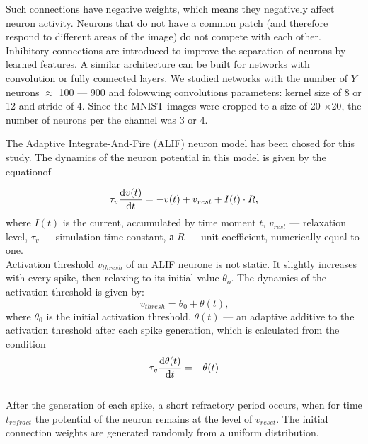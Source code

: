 \documentclass[a4paper,10pt]{article}
\begin{document}
Such connections have negative weights, which means they negatively affect neuron activity. Neurons that do not have a common patch (and therefore respond to different areas of the image) do not compete with each other. Inhibitory connections are introduced to improve the separation of neurons by learned features. A similar architecture can be built for networks with convolution or fully connected layers. We studied networks with the number of $Y$ neurons $\approx$ 100 --- 900 and folowwing convolutions parameters: kernel size of 8 or 12 and stride of 4. Since the MNIST images were cropped to a size of 20 $\times 20$, the number of neurons per the channel was 3 or 4.

The Adaptive Integrate-And-Fire (ALIF) neuron model has been chosed for this study. The dynamics of the neuron potential in this model is given by the equationof

\begin{equation} \label{eq:alif}
 \tau_v \dv{v(t)}{t} = -v(t) + v_{rest} + I(t) \cdot R \text{,}
\end{equation} where $I(t)$ is the current, accumulated by time moment $t$, $v_{rest}$ --- relaxation level, $\tau_v$ --- simulation time constant, а $R$ --- unit coefficient, numerically equal to one.\\ 

Activation threshold $v_{thresh}$ of an ALIF neurone is not static. It slightly increases with every spike, then relaxing to its initial value $\theta_o$. The dynamics of the activation threshold is given by:
\begin{equation} 
 v_{thresh} = \theta_0 + \theta(t) \text{,}
\end{equation} where $\theta_0$ is the initial activation threshold, $\theta(t)$ --- an adaptive additive to the activation threshold after each spike generation, which is calculated from the condition\\

\begin{equation}
 \tau_v \dv{\theta(t)}{t} = -\theta(t)
\end{equation}\\

After the generation of each spike, a short refractory period occurs, when for time $t_{refract}$ the potential of the neuron remains at the level of $v_{reset}$. The initial connection weights are generated randomly from a uniform distribution.
\end{document}
